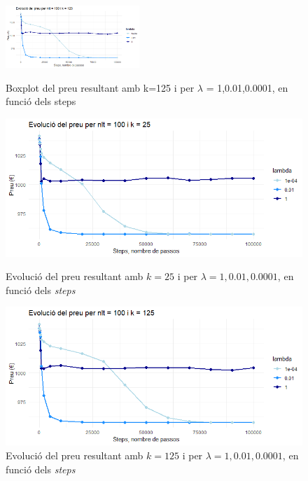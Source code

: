 \documentclass[a4paper]{article}
\begin{document}
	\begin{figure}[H]
		\centering
		\includegraphics[width=0.45\textwidth]{images/exp3_k125.png}
		\caption{Boxplot del preu resultant amb k=125 i per $\lambda$ = {1,0.01,0.0001}, en funció dels steps}
		\label{fig:exp3_k125}
		\begin{minipage}{0.45\textwidth}
			\centering
			\includegraphics[width=\textwidth]{images/exp3_k25.png}
			\caption{Evolució del preu resultant amb $k=25$ i per $\lambda = {1, 0.01, 0.0001}$, en funció dels \textit{steps}}
			\label{fig:exp3_k25}
		\end{minipage}%
		\hspace{0.05\textwidth} %
		\begin{minipage}{0.45\textwidth}
			\centering
			\includegraphics[width=\textwidth]{images/exp3_k125.png}
			\caption{Evolució del preu resultant amb $k=125$ i per $\lambda = {1,0.01,0.0001}$, en funció dels \textit{steps}}
			\label{fig:exp3_k125}
		\end{minipage}
	\end{figure}
	
\end{document}
